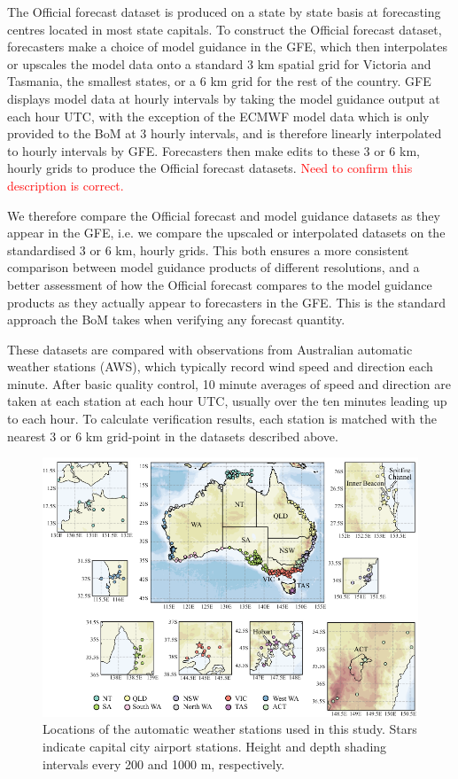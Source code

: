 \documentclass[twocol]{ametsoc}
\begin{document}
The Official forecast dataset is produced on a state by state basis at forecasting centres located in most state capitals. To construct the Official forecast dataset, forecasters make a choice of model guidance in the GFE, which then interpolates or upscales the model data onto a standard 3 km spatial grid for Victoria and Tasmania, the smallest states, or a 6 km grid for the rest of the country. GFE displays model data at hourly intervals by taking the model guidance output at each hour UTC, with the exception of the ECMWF model data which is only provided to the BoM at 3 hourly intervals, and is therefore linearly interpolated to hourly intervals by GFE. Forecasters then make edits to these 3 or 6 km, hourly grids to produce the Official forecast datasets. \textcolor{red}{Need to confirm this description is correct.}

We therefore compare the Official forecast and model guidance datasets as they appear in the GFE, i.e. we compare the upscaled or interpolated datasets on the standardised 3 or 6 km, hourly grids. This both ensures a more consistent comparison between model guidance products of different resolutions, and a better assessment of how the Official forecast compares to the model guidance products as they actually appear to forecasters in the GFE. This is the standard approach the BoM takes when verifying any forecast quantity.

These datasets are compared with observations from Australian automatic weather stations (AWS), which typically record wind speed and direction each minute. After basic quality control, 10 minute averages of speed and direction are taken at each station at each hour UTC, usually over the ten minutes leading up to each hour. To calculate verification results, each station is matched with the nearest 3 or 6 km grid-point in the datasets described above.

\begin{figure}
\centering
\includegraphics[width=39pc]{map.pdf}
\caption{Locations of the automatic weather stations used in this study. Stars indicate capital city airport stations. Height and depth shading intervals every 200 and 1000 m, respectively.}
\label{Fig:map}
\end{figure}
\end{document}
